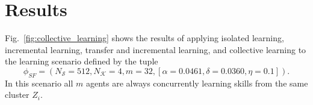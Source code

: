 \section{Results}\label{sec:use_case_results}
Fig.~\ref{fig:collective_learning} shows the results of applying isolated learning, incremental learning, transfer and incremental learning, and collective learning to the learning scenario defined by the tuple
\begin{equation*}
	\phi_{SF} = \left(N_\mathcal{S}= 512, N_\mathcal{K}=4, m=32, \left[\alpha =  0.0461, \delta =  0.0360, \eta= 0.1\right]\right).
\end{equation*}
In this scenario all $m$ agents are always concurrently learning skills from the same cluster $Z_i$.
\begin{figure}[!h]
	\centering
	\hspace*{\fill}
	\hspace*{\fill}
	\\	
	\hspace*{\fill}
	\hspace*{\fill}
	\\	
	\hspace*{\fill}
	\hspace*{\fill}	
	\\
	\hspace*{\fill}

\end{figure}
